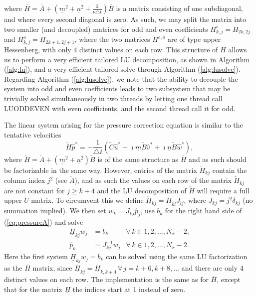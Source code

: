\documentclass[11pt, oneside]{article}
\newcommand{\N}[1]{\check{#1}}
\newcommand{\D}[1]{\overline{#1}}
\begin{document}
where $\D{H}=\D{A} +(\underline{m}^2 + \underline{n}^2 + \frac{2}{\nu \triangle t})\D{B}$ is a matrix consisting of one subdiagonal, and where every second diagonal is zero. As such, we may split the matrix into two smaller (and decoupled) matrices for odd and even coefficients $H^e_{k,j} = H_{2k,2j}$ and $H^o_{k,j} = H_{2k+1,2j+1}$, where the two matrices $H^{e,o}$ are of type upper Hessenberg, with only 4 distinct values on each row. This structure of $H$ allows us to perform a very efficient tailored LU decomposition, as shown in Algorithm (\ref{alg:lu}), and a very efficient tailored solve through Algorithm (\ref{alg:lusolve}). Regarding Algorithm (\ref{alg:lusolve}), we note that the ability to decouple the system into odd and even coefficients leads to two subsystem that may be trivially solved simultaneously in two threads by letting one thread call LUODDEVEN with even coefficients, and the second thread call it for odd. 

The linear system arising for the pressure correction equation is similar to the tentative velocities
\begin{equation}
\N{H}\hat{p}^* = -\frac{1}{\triangle t}\left( \tilde{C} \hat{u}^* + \imath \underline{m} \tilde{B} \hat{v}^* + \imath \underline{n} \tilde{B} \hat{w}^* \right), \label{eq:pressureA}
\end{equation}
where $\N{H}=\N{A} +(\underline{m}^2 + \underline{n}^2)\N{B}$ is of the same structure as $\D{H}$ and as such  should be factorizable in the same way. However, entries of the matrix $\N{H}_{kj}$ contain the column index $j^2$ (see $\N{A}$), and as such the values on each row of the matrix $\N{H}_{kj}$ are not constant for $j \ge k+4$ and the LU decomposition of $\N{H}$ will require a full upper $U$ matrix. To circumvent this we define $\N{H}_{kj} = \underline{H}_{kl}J_{lj}$, where $J_{kj}= j^2\delta_{kj}$ (no summation implied). We then set $w_k=J_{kj}\hat{p}_j$, use $b_k$ for the right hand side of (\ref{eq:pressureA}) and solve
\begin{align}
  \underline{H}_{kj}w_j &= b_k &\forall \, k \in 1, 2, \ldots, N_x-2, \\
  \hat{p}_k &= J_{kj}^{-1}w_j &\forall \, k \in 1, 2, \ldots, N_x-2.
\end{align}
Here the first system $\underline{H}_{kj} w_j = b_k$ can be solved using the same LU factorization as the $\D{H}$ matrix, since $\underline{H}_{kj}=\underline{H}_{k, k+4}\, \forall \, j=k+6, k+8, \ldots$ and there are only 4 distinct values on each row. The implementation is the same as for $\D{H}$, except that for the matrix $\underline{H}$ the indices start at 1 instead of zero.
\end{document}
